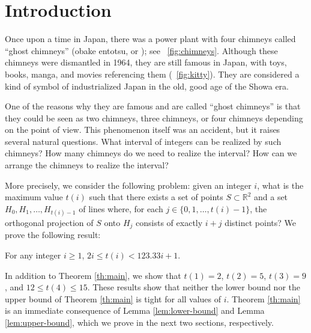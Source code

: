 \documentclass{ws-ijcga}
\newcommand{\R}{\mathbb{R}}
\begin{document}
\section{Introduction}

Once upon a time in Japan, there was a power plant with four chimneys
called ``ghost chimneys'' (obake entotsu, or
);
see \figurename~\ref{fig:chimneys}.
Although these chimneys were dismantled in 1964, they are still famous
in Japan, with toys, books, manga, and movies referencing them (\figurename~\ref{fig:kitty}).
They are considered a kind of symbol of industrialized Japan
in the old, good age of the Showa era\cite{adachi}.

One of the reasons why they are famous and are called ``ghost chimneys''
is that they could be seen as two chimneys, three chimneys, 
or four chimneys depending on the point of view.
This phenomenon itself was an accident, but it raises several natural questions.
What interval of integers can be realized by such chimneys?
How many chimneys do we need to realize the interval?
How can we arrange the chimneys to realize the interval?

More precisely, we consider the following problem: given an integer $i$, what
is the maximum value $t(i)$ such that there exists a set of points
$S\subset\R^2$ and a set $H_0,H_1,\ldots,H_{t(i)-1}$ of lines where, for each
$j\in\{0,1,\ldots,t(i)-1\}$, the orthogonal projection of $S$ onto $H_j$
consists of exactly $i+j$ distinct points?  We prove the following result:

\begin{theorem}\label{th:main}
For any integer $i\ge 1$,  $2i \le t(i) < 123.33i+1$.
\end{theorem}

In addition to Theorem \ref{th:main}, we show that $t(1)=2$, $t(2)=5$, $t(3)=9$,
and $12\le t(4)\le 15$.  These results show that neither the lower bound
nor the upper bound of Theorem \ref{th:main} is tight for all values of $i$.
Theorem \ref{th:main} is an immediate consequence of Lemma \ref{lem:lower-bound} and
Lemma \ref{lem:upper-bound}, which we prove in the next two sections, respectively.

\end{document}
